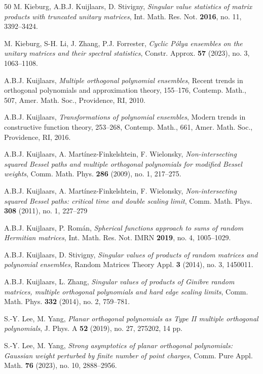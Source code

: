 \documentclass[a4paper,12pt,oneside]{article}
\theoremstyle{definition}
\begin{document}
\begin{thebibliography}{50}
M. Kieburg, A.B.J. Kuijlaars, D. Stivigny, 
\textit{Singular value statistics of matrix products with truncated unitary matrices},
Int. Math. Res. Not. \textbf{2016}, no. 11, 3392--3424.

M. Kieburg, S-H. Li, J. Zhang, P.J. Forrester,
\textit{Cyclic Pólya ensembles on the unitary matrices and their spectral statistics},
Constr. Approx. \textbf{57} (2023), no. 3, 1063--1108.

 A.B.J. Kuijlaars, 
\textit{Multiple orthogonal polynomial ensembles}, 
Recent trends in orthogonal polynomials and approximation theory, 155--176, Contemp. Math., 507, Amer. Math. Soc., Providence, RI, 2010.

A.B.J. Kuijlaars, 
\textit{Transformations of polynomial ensembles}, 
Modern trends in constructive function theory, 253--268, Contemp. Math., 661, Amer. Math. Soc., Providence, RI, 2016.

A.B.J. Kuijlaars, A. Martínez-Finkelshtein, F. Wielonsky, 
\textit{Non-intersecting squared Bessel paths and multiple orthogonal polynomials for modified Bessel weights}, 
Comm. Math. Phys. \textbf{286} (2009), no. 1, 217--275.

A.B.J. Kuijlaars, A. Martínez-Finkelshtein, F. Wielonsky, 
\textit{Non-intersecting squared Bessel paths: critical time and double scaling limit},
Comm. Math. Phys. \textbf{308} (2011), no. 1, 227--279

A.B.J. Kuijlaars, P. Román, 
\textit{Spherical functions approach to sums of random Hermitian matrices},
Int. Math. Res. Not. IMRN \textbf{2019}, no. 4, 1005--1029.

 A.B.J. Kuijlaars, D. Stivigny, 
\textit{Singular values of products of random matrices and polynomial ensembles},
Random Matrices Theory Appl. \textbf{3} (2014), no. 3, 1450011.

A.B.J. Kuijlaars, L. Zhang,
\textit{Singular values of products of Ginibre random matrices, multiple orthogonal polynomials and hard edge scaling limits}, 
Comm. Math. Phys. \textbf{332} (2014), no. 2, 759--781. 

S.-Y. Lee, M. Yang, \textit{Planar orthogonal polynomials as Type II multiple orthogonal polynomials}, J. Phys. A \textbf{52} (2019), no. 27, 275202, 14 pp. 

S.-Y. Lee, M. Yang, \textit{Strong asymptotics of planar orthogonal polynomials: Gaussian weight perturbed by finite number of point charges}, Comm. Pure Appl. Math. \textbf{76} (2023), no. 10, 2888--2956.


\end{thebibliography}
\end{document}
